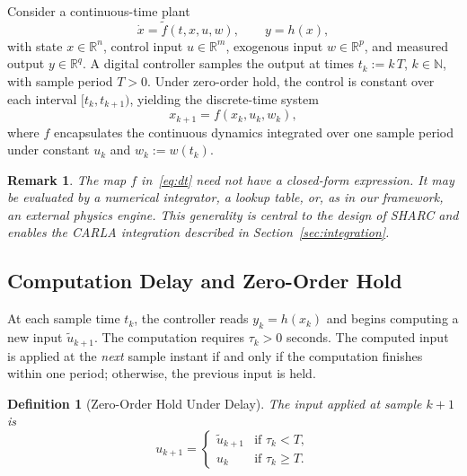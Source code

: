 \documentclass[conference]{IEEEtran}
\newcommand{\R}{\mathbb{R}}
\newcommand{\N}{\mathbb{N}}
\newtheorem{definition}{Definition}
\newtheorem{remark}{Remark}
\begin{document}
Consider a continuous-time plant
\begin{equation}\label{eq:ct}
  \dot{x} = \tilde{f}(t, x, u, w), \qquad y = h(x),
\end{equation}
with state $x \in \R^{n}$, control input $u \in \R^{m}$, exogenous
input $w \in \R^{p}$, and measured output $y \in \R^{q}$.
A digital controller samples the output at times
$t_k := k\,T$, $k \in \N$, with sample period $T > 0$.
Under zero-order hold, the control is constant over each interval
$[t_k, t_{k+1})$, yielding the discrete-time system
\begin{equation}\label{eq:dt}
  x_{k+1} = f(x_k, u_k, w_k),
\end{equation}
where $f$ encapsulates the continuous dynamics integrated over one
sample period under constant $u_k$ and $w_k := w(t_k)$.

\begin{remark}\label{rem:f_general}
  The map $f$ in~\eqref{eq:dt} need not have a closed-form
  expression.  It may be evaluated by a numerical integrator, a
  lookup table, or, as in our framework, an external physics
  engine.  This generality is central to the design of SHARC and
  enables the CARLA integration described in
  Section~\ref{sec:integration}.
\end{remark}

\subsection{Computation Delay and Zero-Order Hold}

At each sample time $t_k$, the controller reads $y_k = h(x_k)$
and begins computing a new input $\tilde{u}_{k+1}$.  The
computation requires $\tau_k > 0$ seconds.  The computed input is
applied at the \emph{next} sample instant if and only if the
computation finishes within one period; otherwise, the previous
input is held.

\begin{definition}[Zero-Order Hold Under Delay]\label{def:zoh}
  The input applied at sample $k{+}1$ is
  \begin{equation}\label{eq:zoh}
    u_{k+1} = \begin{cases}
      \tilde{u}_{k+1} & \text{if } \tau_k < T, \\
      u_k              & \text{if } \tau_k \geq T.
    \end{cases}
  \end{equation}
\end{definition}
\end{document}
